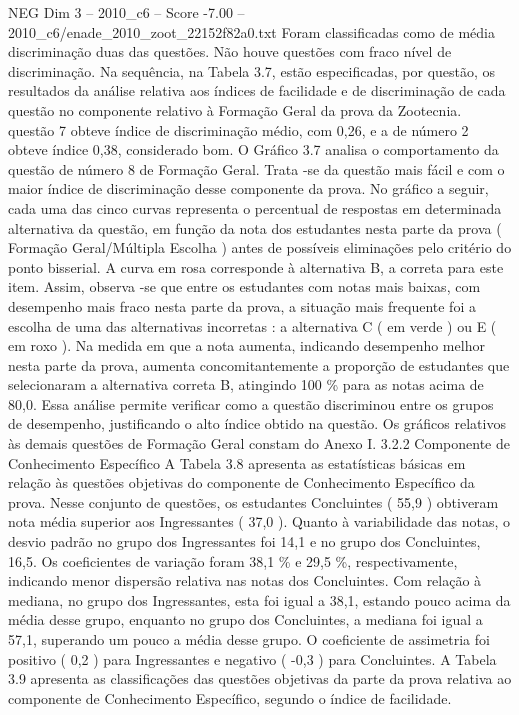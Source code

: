 \begin{textsample}{NEG Dim 3 – 2010\_c6 – Score -7.00 – 2010\_c6/enade\_2010\_zoot\_22152f82a0.txt}
Foram classificadas como de média discriminação duas das questões.
Não houve questões com fraco nível de discriminação.
Na sequência, na Tabela 3.7, estão especificadas, por questão, os resultados da análise relativa aos índices de facilidade e de discriminação de cada questão no componente relativo à Formação Geral da prova da Zootecnia. questão 7 obteve índice de discriminação médio, com 0,26, e a de número 2 obteve índice 0,38, considerado bom.
O Gráfico 3.7 analisa o comportamento da questão de número 8 de Formação Geral.
Trata -se da questão mais fácil e com o maior índice de discriminação desse componente da prova.
No gráfico a seguir, cada uma das cinco curvas representa o percentual de respostas em determinada alternativa da questão, em função da nota dos estudantes nesta parte da prova ( Formação Geral/Múltipla Escolha ) antes de possíveis eliminações pelo critério do ponto bisserial.
A curva em rosa corresponde à alternativa B, a correta para este item.
Assim, observa -se que entre os estudantes com notas mais baixas, com desempenho mais fraco nesta parte da prova, a situação mais frequente foi a escolha de uma das alternativas incorretas : a alternativa C ( em verde ) ou E ( em roxo ).
Na medida em que a nota aumenta, indicando desempenho melhor nesta parte da prova, aumenta concomitantemente a proporção de estudantes que selecionaram a alternativa correta B, atingindo 100 \% para as notas acima de 80,0.
Essa análise permite verificar como a questão discriminou entre os grupos de desempenho, justificando o alto índice obtido na questão.
Os gráficos relativos às demais questões de Formação Geral constam do Anexo I. 3.2.2 Componente de Conhecimento Específico A Tabela 3.8 apresenta as estatísticas básicas em relação às questões objetivas do componente de Conhecimento Específico da prova.
Nesse conjunto de questões, os estudantes Concluintes ( 55,9 ) obtiveram nota média superior aos Ingressantes ( 37,0 ).
Quanto à variabilidade das notas, o desvio padrão no grupo dos Ingressantes foi 14,1 e no grupo dos Concluintes, 16,5.
Os coeficientes de variação foram 38,1 \% e 29,5 \%, respectivamente, indicando menor dispersão relativa nas notas dos Concluintes.
Com relação à mediana, no grupo dos Ingressantes, esta foi igual a 38,1, estando pouco acima da média desse grupo, enquanto no grupo dos Concluintes, a mediana foi igual a 57,1, superando um pouco a média desse grupo.
O coeficiente de assimetria foi positivo ( 0,2 ) para Ingressantes e negativo ( -0,3 ) para Concluintes.
A Tabela 3.9 apresenta as classificações das questões objetivas da parte da prova relativa ao componente de Conhecimento Específico, segundo o índice de facilidade.

\end{textsample}
